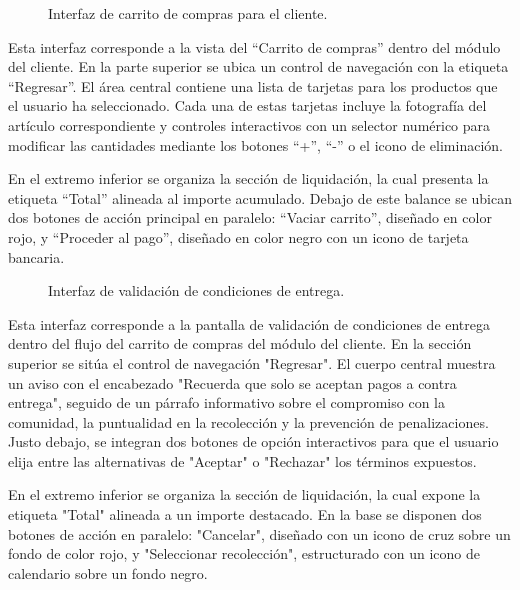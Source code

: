\begin{figure}[H]
    \centering
    
    \caption{Interfaz de carrito de compras para el cliente.}
    \label{fig:ui-cli-08}
\end{figure}

Esta interfaz corresponde a la vista del ``Carrito de compras'' dentro del módulo del cliente. En la parte superior se ubica un control de navegación con la etiqueta ``Regresar''. El área central contiene una lista de tarjetas para los productos que el usuario ha seleccionado. Cada una de estas tarjetas incluye la fotografía del artículo correspondiente y controles interactivos con un selector numérico para modificar las cantidades mediante los botones ``+'', ``-'' o el icono de eliminación.

En el extremo inferior se organiza la sección de liquidación, la cual presenta la etiqueta ``Total'' alineada al importe acumulado. Debajo de este balance se ubican dos botones de acción principal en paralelo: ``Vaciar carrito'', diseñado en color rojo, y ``Proceder al pago'', diseñado en color negro con un icono de tarjeta bancaria.

\begin{figure}[H]
    \centering
    
    \caption{Interfaz de validación de condiciones de entrega.}
    \label{fig:ui-cli-09}
\end{figure}

Esta interfaz corresponde a la pantalla de validación de condiciones de entrega dentro del flujo del carrito de compras del módulo del cliente. En la sección superior se sitúa el control de navegación "Regresar". El cuerpo central muestra un aviso con el encabezado "Recuerda que solo se aceptan pagos a contra entrega", seguido de un párrafo informativo sobre el compromiso con la comunidad, la puntualidad en la recolección y la prevención de penalizaciones. Justo debajo, se integran dos botones de opción interactivos para que el usuario elija entre las alternativas de "Aceptar" o "Rechazar" los términos expuestos. 

En el extremo inferior se organiza la sección de liquidación, la cual expone la etiqueta "Total" alineada a un importe destacado. En la base se disponen dos botones de acción en paralelo: "Cancelar", diseñado con un icono de cruz sobre un fondo de color rojo, y "Seleccionar recolección", estructurado con un icono de calendario sobre un fondo negro. 


